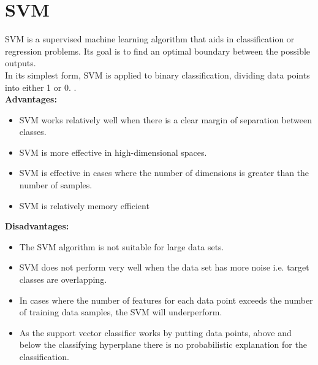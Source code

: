 \documentclass{template}
\begin{document}
\section{SVM}
SVM is a supervised machine learning algorithm that aids in classification or regression problems. Its goal is to find an optimal boundary between the possible outputs.\\
In its simplest form, SVM is applied to binary classification, dividing data points into either 1 or 0.
\newpage
.\\
\textbf{Advantages:}
\begin{itemize}
    \item SVM works relatively well when there is a clear margin of separation between classes.

    \item SVM is more effective in high-dimensional spaces.
    \item SVM is effective in cases where the number of dimensions is greater than the number of samples.
    \item SVM is relatively memory efficient
\end{itemize}
\textbf{Disadvantages:}
\begin{itemize}
    \item The SVM algorithm is not suitable for large data sets.
    \item SVM does not perform very well when the data set has more noise i.e. target classes are overlapping.
    \item In cases where the number of features for each data point exceeds the number of training data samples, the SVM will underperform. 
    \item As the support vector classifier works by putting data points, above and below the classifying hyperplane there is no probabilistic explanation for the classification.\cite{svm}
\end{itemize}
\end{document}
